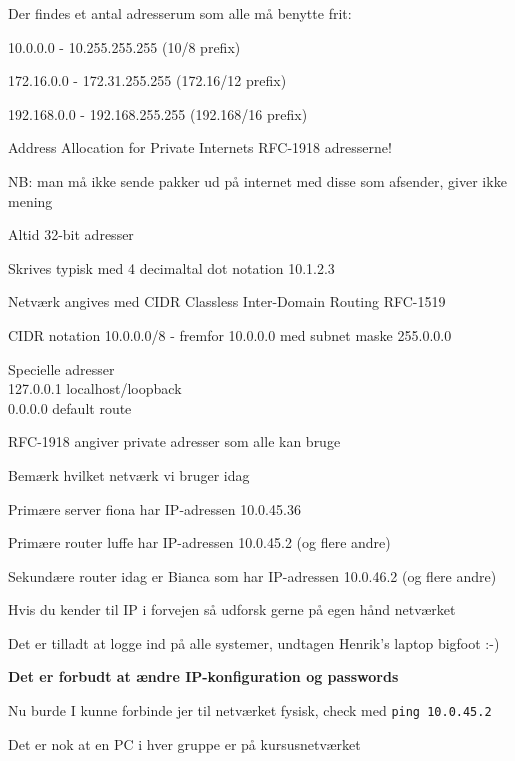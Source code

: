 \documentclass[Screen16to9,17pt,footrule]{foils}
\begin{document}

\begin{list1}
\item Der findes et antal adresserum som alle må benytte frit:
\begin{list2}
\item 10.0.0.0    -  10.255.255.255  (10/8 prefix)
\item 172.16.0.0  -  172.31.255.255  (172.16/12 prefix)
\item 192.168.0.0 -  192.168.255.255 (192.168/16 prefix)
\end{list2}
\item Address Allocation for Private Internets RFC-1918 adresserne!
\item NB: man må ikke sende pakker ud på internet med disse som afsender, giver ikke mening
\end{list1}


\begin{list2}
\item Altid 32-bit adresser
\item Skrives typisk med 4 decimaltal dot notation 10.1.2.3
\item Netværk angives med CIDR Classless Inter-Domain Routing RFC-1519
\item CIDR notation 10.0.0.0/8 -
  fremfor 10.0.0.0 med subnet maske 255.0.0.0
\item Specielle adresser\\
127.0.0.1 localhost/loopback\\
0.0.0.0  default route
\item RFC-1918 angiver private adresser som alle kan bruge

\end{list2}



\begin{list1}
\item Bemærk hvilket netværk vi bruger idag
\item Primære server fiona har IP-adressen 10.0.45.36
\item Primære router luffe har IP-adressen 10.0.45.2 (og flere andre)
\item Sekundære router idag er Bianca som har IP-adressen 10.0.46.2 (og flere andre)
\item Hvis du kender til IP i forvejen så udforsk gerne på egen hånd netværket
\item Det er tilladt at logge ind på alle systemer, undtagen Henrik's laptop bigfoot :-)
\item {\bf Det er forbudt at ændre IP-konfiguration og passwords}
\item Nu burde I kunne forbinde jer til netværket fysisk, check med \verb+ping 10.0.45.2+
\item Det er nok at en PC i hver gruppe er på kursusnetværket
\end{list1}
\end{document}
